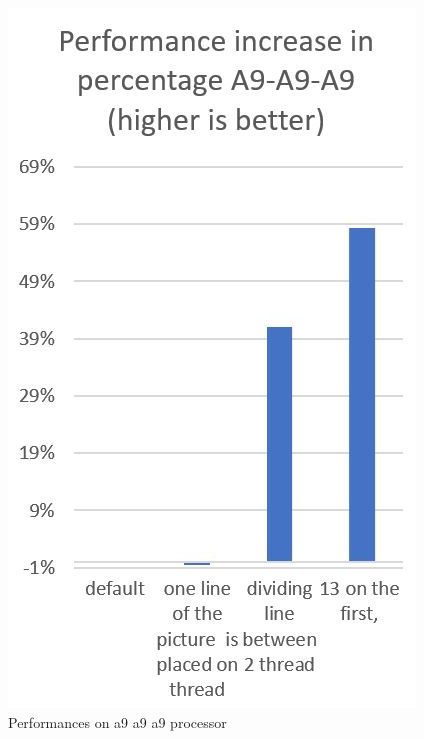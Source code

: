 \documentclass[journal]{IEEEtran}
\begin{document}
\begin{figure}[!h]
	\centering
	\includegraphics[width=.8\linewidth]{a9a9a9}
	\caption{Performances on a9 a9 a9 processor}
	\label{fig:a9a9a9}
\end{figure}
\end{document}
